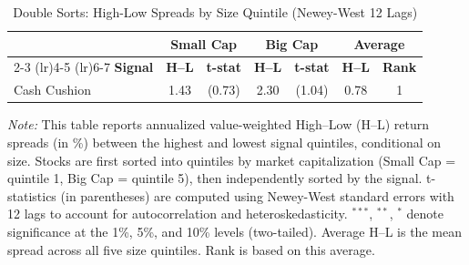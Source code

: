 \begin{table}[htbp]
  \centering
  \caption{Double Sorts: High-Low Spreads by Size Quintile (Newey-West 12 Lags)}
  \label{tab:double_sort_summary}
  \small
  \begin{tabular}{@{}lcccccc@{}}
    \toprule
    & \multicolumn{2}{c}{\textbf{Small Cap}} & \multicolumn{2}{c}{\textbf{Big Cap}} & \multicolumn{2}{c}{\textbf{Average}} \\
    \cmidrule(lr){2-3} \cmidrule(lr){4-5} \cmidrule(lr){6-7}
    \textbf{Signal} & \textbf{H--L} & \textbf{t-stat} & \textbf{H--L} & \textbf{t-stat} & \textbf{H--L} & \textbf{Rank} \\
    \midrule
    Cash Cushion & 1.43 & (0.73) & 2.30 & (1.04) & 0.78 & 1 \\
    \bottomrule
  \end{tabular}
  
  \begin{minipage}{\textwidth}
    \small
    \textit{Note:} This table reports annualized value-weighted High--Low (H--L) return spreads (in \%) between the highest and lowest signal quintiles, conditional on size.
    Stocks are first sorted into quintiles by market capitalization (Small Cap = quintile 1, Big Cap = quintile 5), then independently sorted by the signal.
    t-statistics (in parentheses) are computed using Newey-West standard errors with 12 lags to account for autocorrelation and heteroskedasticity.
    $^{***}$, $^{**}$, $^{*}$ denote significance at the 1\%, 5\%, and 10\% levels (two-tailed).
    Average H--L is the mean spread across all five size quintiles. Rank is based on this average.
  \end{minipage}
\end{table}